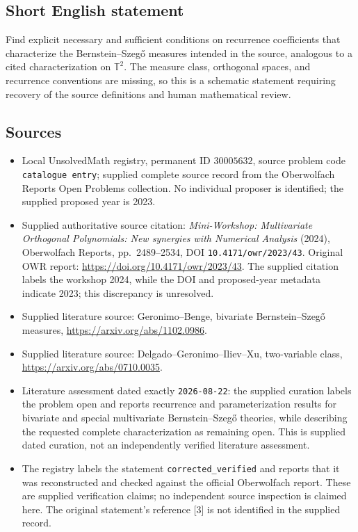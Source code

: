 \documentclass[11pt]{article}
\begin{document}
\subsection{Short English statement}
Find explicit necessary and sufficient conditions on recurrence coefficients that characterize the Bernstein--Szeg\H{o} measures intended in the source, analogous to a cited characterization on \(\mathbb T^2\). The measure class, orthogonal spaces, and recurrence conventions are missing, so this is a schematic statement requiring recovery of the source definitions and human mathematical review.
\subsection{Sources}
\begin{itemize}
\item Local UnsolvedMath registry, permanent ID \(30005632\), source problem code \texttt{catalogue entry}; supplied complete source record from the Oberwolfach Reports Open Problems collection. No individual proposer is identified; the supplied proposed year is 2023.
\item Supplied authoritative source citation: \emph{Mini-Workshop: Multivariate Orthogonal Polynomials: New synergies with Numerical Analysis} (2024), Oberwolfach Reports, pp.\ 2489--2534, DOI \texttt{10.4171/owr/2023/43}. Original OWR report: \url{https://doi.org/10.4171/owr/2023/43}. The supplied citation labels the workshop 2024, while the DOI and proposed-year metadata indicate 2023; this discrepancy is unresolved.
\item Supplied literature source: Geronimo--Benge, bivariate Bernstein--Szeg\H{o} measures, \url{https://arxiv.org/abs/1102.0986}.
\item Supplied literature source: Delgado--Geronimo--Iliev--Xu, two-variable class, \url{https://arxiv.org/abs/0710.0035}.
\item Literature assessment dated exactly \texttt{2026-08-22}: the supplied curation labels the problem open and reports recurrence and parameterization results for bivariate and special multivariate Bernstein--Szeg\H{o} theories, while describing the requested complete characterization as remaining open. This is supplied dated curation, not an independently verified literature assessment.
\item The registry labels the statement \texttt{corrected\_verified} and reports that it was reconstructed and checked against the official Oberwolfach report. These are supplied verification claims; no independent source inspection is claimed here. The original statement's reference [3] is not identified in the supplied record.
\end{itemize}
\end{document}
